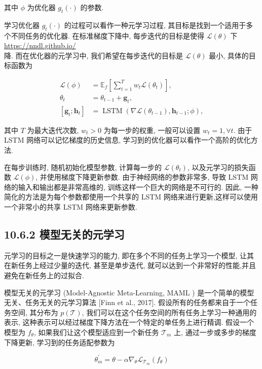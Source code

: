 \documentclass[10pt]{article}
\begin{document}
其中 $\phi$ 为优化器 $g_{t}(\cdot)$ 的参数.

学习优化器 $g_{t}(\cdot)$ 的过程可以看作一种元学习过程, 其目标是找到一个适用于多个不同任务的优化器. 在标准梯度下降中, 每步迭代的目标是使得 $\mathcal{L}(\theta)$ 下 \href{https://nndl.github.io/}{https://nndl.github.io/}\\
降. 而在优化器的元学习中, 我们希望在每步迭代的目标是 $\mathcal{L}(\theta)$ 最小, 具体的目标函数为


\begin{align*}
\mathcal{L}(\phi) & =\mathbb{E}_{f}\left[\sum_{t=1}^{T} w_{t} \mathcal{L}\left(\theta_{t}\right)\right],  \tag{10.53}\\
\theta_{t} & =\theta_{t-1}+\boldsymbol{g}_{t},  \tag{10.54}\\
{\left[\boldsymbol{g}_{t} ; \boldsymbol{h}_{t}\right] } & =\operatorname{LSTM}\left(\nabla \mathcal{L}\left(\theta_{t-1}\right), \boldsymbol{h}_{t-1} ; \phi\right), \tag{10.55}
\end{align*}


其中 $T$ 为最大迭代次数, $w_{t}>0$ 为每一步的权重, 一般可以设置 $w_{t}=1, \forall t$. 由于 LSTM 网络可以记忆梯度的历史信息, 学习到的优化器可以看作一个高阶的优化方法.

在每步训练时, 随机初始化模型参数, 计算每一步的 $\mathcal{L}\left(\theta_{t}\right)$, 以及元学习的损失函数 $\mathcal{L}(\phi)$, 并使用梯度下降更新参数. 由于神经网络的参数非常多, 导致 LSTM 网络的输入和输出都是非常高维的, 训练这样一个巨大的网络是不可行的. 因此, 一种简化的方法是为每个参数都使用一个共享的 LSTM 网络来进行更新,这样可以使用一个非常小的共享 LSTM 网络来更新参数.

\subsection*{10.6.2 模型无关的元学习}
元学习的目标之一是快速学习的能力, 即在多个不同的任务上学习一个模型, 让其在新任务上经过少量的迭代, 甚至是单步迭代, 就可以达到一个非常好的性能,并且避免在新任务上的过拟合.

模型无关的元学习 (Model-Agnostic Meta-Learning, MAML ) 是一个简单的模型无关、任务无关的元学习算法 [Finn et al., 2017]. 假设所有的任务都来自于一个任务空间, 其分布为 $p(\mathcal{T})$, 我们可以在这个任务空间的所有任务上学习一种通用的表示, 这种表示可以经过梯度下降方法在一个特定的单任务上进行精调. 假设一个模型为 $f_{\theta}$, 如果我们让这个模型适应到一个新任务 $\mathcal{T}_{m}$ 上, 通过一步或多步的梯度下降更新, 学习到的任务适配参数为


\begin{equation*}
\theta_{m}^{\prime}=\theta-\alpha \nabla_{\theta} \mathcal{L}_{\mathcal{T}_{m}}\left(f_{\theta}\right) \tag{10.56}
\end{equation*}
\end{document}
